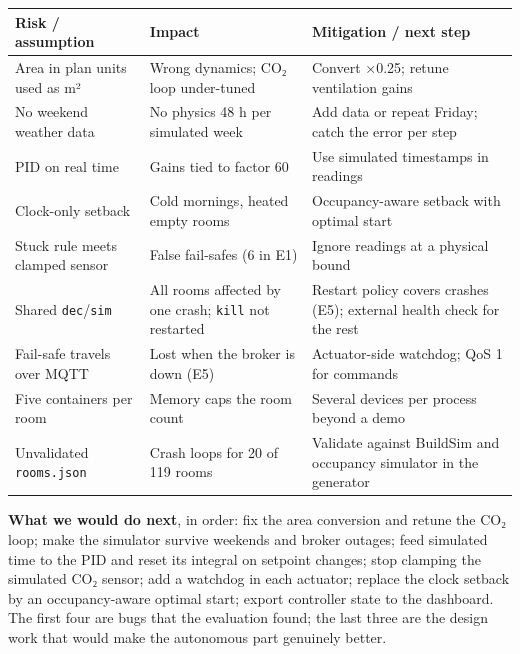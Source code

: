 \documentclass[11pt]{article}
\makeatletter
\DeclareRobustCommand{\_}{\ifmmode\nfss@text{\textunderscore}\else\textunderscore\allowbreak\fi}
\newcommand{\file}[1]{\texttt{#1}}
\makeatother
\begin{document}
\begin{longtable}[]{@{}
  >{\raggedright\arraybackslash}p{}
  >{\raggedright\arraybackslash}p{}
  >{\raggedright\arraybackslash}p{}@{}}
\toprule
\textbf{Risk / assumption} & \textbf{Impact} & \textbf{Mitigation / next step} \\
\midrule
\endhead
Area in plan units used as m² & Wrong dynamics; CO₂ loop under-tuned & Convert ×0.25; retune ventilation gains \\
No weekend weather data & No physics 48 h per simulated week & Add data or repeat Friday; catch the error per step \\
PID on real time & Gains tied to factor 60 & Use simulated timestamps in readings \\
Clock-only setback & Cold mornings, heated empty rooms & Occupancy-aware setback with optimal start \\
Stuck rule meets clamped sensor & False fail-safes (6 in E1) & Ignore readings at a physical bound \\
Shared \texttt{dec}/\texttt{sim} & All rooms affected by one crash; \texttt{kill} not restarted & Restart policy covers crashes (E5); external health check for the rest \\
Fail-safe travels over MQTT & Lost when the broker is down (E5) & Actuator-side watchdog; QoS 1 for commands \\
Five containers per room & Memory caps the room count & Several devices per process beyond a demo \\
Unvalidated \file{rooms.json} & Crash loops for 20 of 119 rooms & Validate against BuildSim and occupancy simulator in the generator \\
\bottomrule
\end{longtable}

\textbf{What we would do next}, in order: fix the area conversion and retune the
CO₂ loop; make the simulator survive weekends and broker outages; feed simulated
time to the PID and reset its integral on setpoint changes; stop clamping the
simulated CO₂ sensor; add a watchdog in each actuator; replace the clock setback
by an occupancy-aware optimal start; export controller state to the dashboard.
The first four are bugs that the evaluation found; the last three are the design
work that would make the autonomous part genuinely better.
\end{document}
